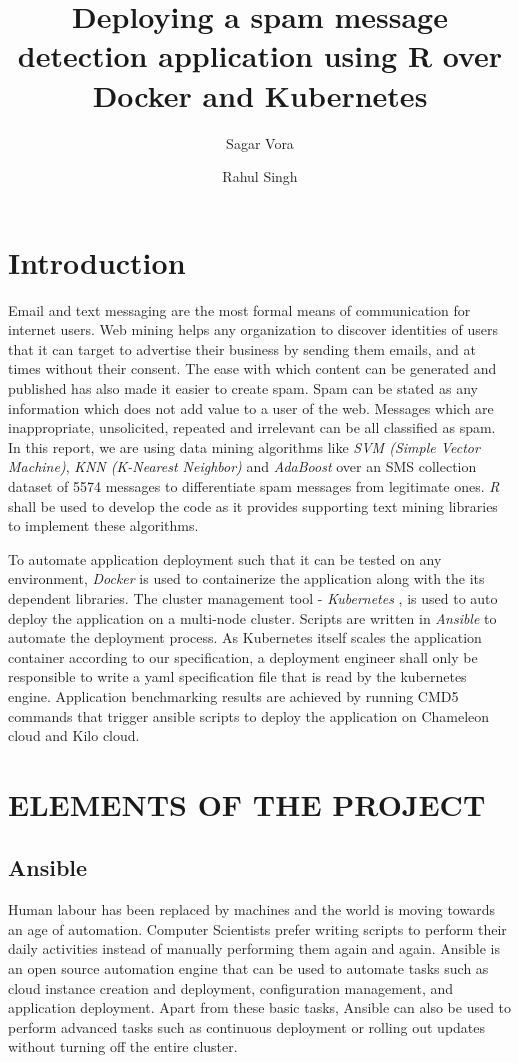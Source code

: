 \documentclass[9pt,twocolumn,twoside]{../../styles/osajnl}
\title{Deploying a spam message detection application using R over Docker and Kubernetes}
\author[1,*]{Sagar Vora}
\author[1,**]{Rahul Singh}
\affil[1]{School of Informatics and Computing, Bloomington, IN 47408, U.S.A.}
\affil[*]{Corresponding authors: vorasagar7@gmail.com, rahul\textunderscore singh919@yahoo.com}
\begin{document}
\maketitle

\section{Introduction}

Email and text messaging are the most formal means of communication
for internet users. Web mining helps any organization to discover
identities of users that it can target to advertise their business by
sending them emails, and at times without their consent. The ease with
which content can be generated and published has also made it easier
to create spam. Spam can be stated as any information which does not
add value to a user of the web. Messages which are inappropriate,
unsolicited, repeated and irrelevant can be all classified as spam. In
this report, we are using data mining algorithms like \emph{SVM
  (Simple Vector Machine)}, \emph{KNN (K-Nearest Neighbor)} and
\emph{AdaBoost} over an SMS collection dataset of 5574 messages to
differentiate spam messages from legitimate ones. \emph{R}
\cite{www-about-rproject} shall be used to develop the code as it
provides supporting text mining libraries to implement these
algorithms.

\noindent
To automate application deployment such that it can be tested on any
environment, \emph{Docker} \cite{www-docker-about} is used to
containerize the application along with the its dependent
libraries. The cluster management tool - \emph{Kubernetes}
\cite{www-kubernetes-home}, is used to auto deploy the application on
a multi-node cluster. Scripts are written in \emph{Ansible}
\cite{www-ansible} to automate the deployment process. As Kubernetes
itself scales the application container according to our
specification, a deployment engineer shall only be responsible to
write a yaml specification file that is read by the kubernetes
engine. Application benchmarking results are achieved by running CMD5
commands that trigger ansible scripts to deploy the application on
Chameleon cloud and Kilo cloud.


\section{ELEMENTS OF THE PROJECT}

\subsection{Ansible}
Human labour has been replaced by machines and the world is moving
towards an age of automation. Computer Scientists prefer writing
scripts to perform their daily activities instead of manually
performing them again and again. Ansible is an open source automation
engine that can be used to automate tasks such as cloud instance
creation and deployment, configuration management, and application
deployment. Apart from these basic tasks, Ansible can also be used to
perform advanced tasks such as continuous deployment or rolling out
updates without turning off the entire cluster.
\end{document}
